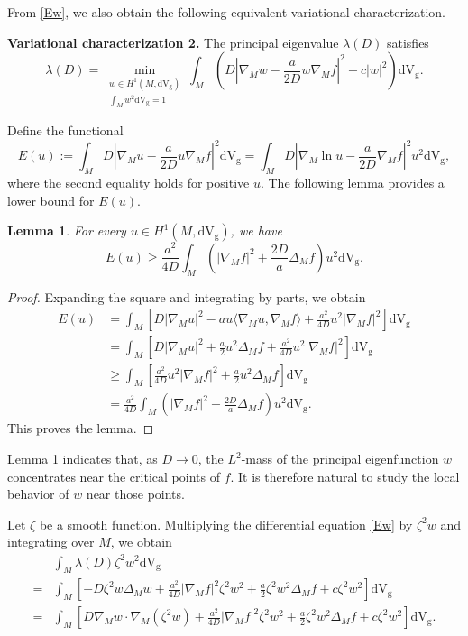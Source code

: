 \documentclass[12pt,reqno]{amsart}
\newtheorem{lemma}{Lemma}[section]
\newcommand{\V}{\mathrm{d} \mathrm{V_g}}
\numberwithin{equation}{section}
\begin{document}
From \eqref{Ew}, we also obtain the following equivalent variational characterization.

\textbf{Variational characterization 2.} The principal eigenvalue $\lambda(D)$ satisfies
\begin{equation}\label{var2}
  \lambda(D)=\min_{\substack{w\in H^1(M,\V)\\ \int_M w^2\V=1}}
  \int_M
 \left(D\left|\nabla_{M} w-\frac{a}{2 D} w\nabla_{M} f\right|^2 + c |w|^2 \right)\V.
\end{equation}

Define the functional
\begin{equation}\label{Eu}
  E(u):=\int_M
 D\left|\nabla_{M} u-\frac{a}{2D} u\nabla_{M} f\right|^2 \V
 =\int_M
 D\left|\nabla_{M} \ln{u}-\frac{a}{2D} \nabla_{M} f\right|^2 u^2 \V,
\end{equation}
where the second equality holds for positive \(u\). The following lemma provides a lower bound for \(E(u)\).
\begin{lemma}\label{lem:2.1}
For every \(u\in H^1(M,\V)\), we have 
\[
E(u)\ge \frac{a^2}{4D}  \int_{M} \left( | \nabla_M f|^2 +
     \frac{2D}{a} \Delta_M f \right) u^2 \V.
\]
\end{lemma}
\begin{proof}
Expanding the square and integrating by parts, we obtain
\[ \begin{aligned}
     E (u) & = \int_{M}\left[ D | \nabla_M u|^2 
     -  a u \langle \nabla_M u,\nabla_M f\rangle
 + \frac{a^2}{4D} u^2  | \nabla_M f|^2\right]\V\\
     & = \int_{M}\left[ D | \nabla_M u|^2 +
     \frac{a}{2} u^2 \Delta_M f +
     \frac{a^2}{4D} u^2  | \nabla_M f|^2\right]\V\\
     & \ge \int_{M}\left[
     \frac{a^2}{4D} u^2  | \nabla_M f|^2 +
     \frac{a}{2} u^2 \Delta_M f
     \right]\V \\
     & = \frac{a^2}{4D}  \int_{M} \left( | \nabla_M f|^2 +
     \frac{2D}{a} \Delta_M f \right) u^2 \V.
   \end{aligned} \]
This proves the lemma.
\end{proof}
Lemma \ref{lem:2.1} indicates that, as $D \rightarrow 0$, the $L^2$-mass of the principal eigenfunction $w$ concentrates near the critical points of $f$. It is therefore natural to study the local behavior of $w$ near those points.

Let $\zeta$ be a smooth function. Multiplying the differential equation \eqref{Ew}
by $\zeta^2 w$ and integrating over $M$, we obtain
\[ \begin{aligned}
     &\int_{M} \lambda (D) \zeta^2 w^2 \V\\
     =& \int_{M}\left[- D \zeta^2 w
     \Delta_M w + \frac{a^2}{4D}  | \nabla_M f|^2 \zeta^2 w^2 +\frac{a}{2} \zeta^2
     w^2 \Delta_M f + c \zeta^2 w^2\right]\!\mathrm{d} \mathrm{V_g}\\
      =&\int_{M}\left[D \nabla_M w \cdot \nabla_M (\zeta^2 w) +
     \frac{a^2}{4D}  | \nabla_M f|^2 \zeta^2 w^2 + \frac{a}{2} \zeta^2 w^2 \Delta_M
     f + c \zeta^2 w^2\right]\!\mathrm{d} \mathrm{V_g} .
   \end{aligned} \]
\end{document}
